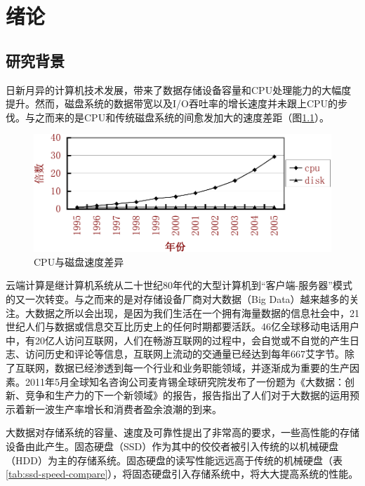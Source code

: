 
\chapter{绪论}
\label{cha:introduction}

\section{研究背景}
\label{sec:background}

日新月异的计算机技术发展，带来了数据存储设备容量和CPU处理能力的大幅度提升。然而，磁盘系统的数据带宽以及I/O吞吐率的增长速度并未跟上CPU的步伐。与之而来的是CPU和传统磁盘系统的间愈发加大的速度差距（图\ref{fig:cpu-disk-diff}）。

\begin{figure}[H]
\centering
\includegraphics[width=0.7\linewidth]{./graph/cpu-disk-gap}
\caption{CPU与磁盘速度差异}
\label{fig:cpu-disk-diff}
\end{figure}

云端计算是继计算机系统从二十世纪80年代的大型计算机到“客户端-服务器”模式的又一次转变。与之而来的是对存储设备厂商对大数据（Big Data）越来越多的关注。大数据之所以会出现，是因为我们生活在一个拥有海量数据的信息社会中，21世纪人们与数据或信息交互比历史上的任何时期都要活跃。46亿全球移动电话用户中，有20亿人访问互联网，人们在畅游互联网的过程中，会自觉或不自觉的产生日志、访问历史和评论等信息，互联网上流动的交通量已经达到每年667艾字节。除了互联网，数据已经渗透到每一个行业和业务职能领域，并逐渐成为重要的生产因素。2011年5月全球知名咨询公司麦肯锡全球研究院发布了一份题为《大数据：创新、竞争和生产力的下一个新领域》的报告，报告指出了人们对于大数据的运用预示着新一波生产率增长和消费者盈余浪潮的到来。

大数据对存储系统的容量、速度及可靠性提出了非常高的要求，一些高性能的存储设备由此产生。固态硬盘（SSD）作为其中的佼佼者被引入传统的以机械硬盘（HDD）为主的存储系统。固态硬盘的读写性能远远高于传统的机械硬盘（表\ref{tab:ssd-speed-compare}），将固态硬盘引入存储系统中，将大大提高系统的性能。


